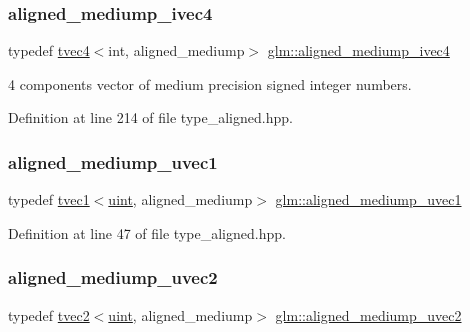 \subsubsection{\texorpdfstring{aligned\_mediump\_ivec4}{aligned\_mediump\_ivec4}}
{\footnotesize\ttfamily typedef \mbox{\hyperlink{structglm_1_1tvec4}{tvec4}}$<$int, aligned\+\_\+mediump$>$ \mbox{\hyperlink{group__gtc__type__aligned_ga76b2981eb152332dd1404b00a15eac50}{glm\+::aligned\+\_\+mediump\+\_\+ivec4}}}



4 components vector of medium precision signed integer numbers. 



Definition at line 214 of file type\+\_\+aligned.\+hpp.

\mbox{\label{group__gtc__type__aligned_gaacb67fc981364f5615b4235ed56e1be2}} 
\subsubsection{\texorpdfstring{aligned\_mediump\_uvec1}{aligned\_mediump\_uvec1}}
{\footnotesize\ttfamily typedef \mbox{\hyperlink{structglm_1_1tvec1}{tvec1}}$<$\mbox{\hyperlink{group__core__precision_ga4fd29415871152bfb5abd588334147c8}{uint}}, aligned\+\_\+mediump$>$ \mbox{\hyperlink{group__gtc__type__aligned_gaacb67fc981364f5615b4235ed56e1be2}{glm\+::aligned\+\_\+mediump\+\_\+uvec1}}}



Definition at line 47 of file type\+\_\+aligned.\+hpp.

\mbox{\label{group__gtc__type__aligned_ga4f1b08e51e44ae6de175343f10ec54a7}} 
\subsubsection{\texorpdfstring{aligned\_mediump\_uvec2}{aligned\_mediump\_uvec2}}
{\footnotesize\ttfamily typedef \mbox{\hyperlink{structglm_1_1tvec2}{tvec2}}$<$\mbox{\hyperlink{group__core__precision_ga4fd29415871152bfb5abd588334147c8}{uint}}, aligned\+\_\+mediump$>$ \mbox{\hyperlink{group__gtc__type__aligned_ga4f1b08e51e44ae6de175343f10ec54a7}{glm\+::aligned\+\_\+mediump\+\_\+uvec2}}}

